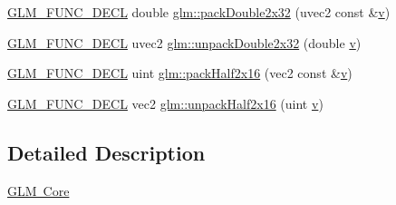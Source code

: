 \begin{DoxyCompactItemize}
\item 
\mbox{\hyperlink{setup_8hpp_ab2d052de21a70539923e9bcbf6e83a51}{G\+L\+M\+\_\+\+F\+U\+N\+C\+\_\+\+D\+E\+CL}} double \mbox{\hyperlink{group__core__func__packing_gaf728fdfb98ce34da6f968d9f6bf154d7}{glm\+::pack\+Double2x32}} (uvec2 const \&\mbox{\hyperlink{glad_8h_a14cfbe2fc2234f5504618905b69d1e06}{v}})
\item 
\mbox{\hyperlink{setup_8hpp_ab2d052de21a70539923e9bcbf6e83a51}{G\+L\+M\+\_\+\+F\+U\+N\+C\+\_\+\+D\+E\+CL}} uvec2 \mbox{\hyperlink{group__core__func__packing_gaea67aa4d065175e7746b2a8a2d00cedb}{glm\+::unpack\+Double2x32}} (double \mbox{\hyperlink{glad_8h_a14cfbe2fc2234f5504618905b69d1e06}{v}})
\item 
\mbox{\hyperlink{setup_8hpp_ab2d052de21a70539923e9bcbf6e83a51}{G\+L\+M\+\_\+\+F\+U\+N\+C\+\_\+\+D\+E\+CL}} uint \mbox{\hyperlink{group__core__func__packing_ga082f6dd65f73a547ed3067ef00be036f}{glm\+::pack\+Half2x16}} (vec2 const \&\mbox{\hyperlink{glad_8h_a14cfbe2fc2234f5504618905b69d1e06}{v}})
\item 
\mbox{\hyperlink{setup_8hpp_ab2d052de21a70539923e9bcbf6e83a51}{G\+L\+M\+\_\+\+F\+U\+N\+C\+\_\+\+D\+E\+CL}} vec2 \mbox{\hyperlink{group__core__func__packing_ga90be544929ed83fa7039208bbab8c0ba}{glm\+::unpack\+Half2x16}} (uint \mbox{\hyperlink{glad_8h_a14cfbe2fc2234f5504618905b69d1e06}{v}})
\end{DoxyCompactItemize}


\subsection{Detailed Description}
\mbox{\hyperlink{group__core}{G\+LM Core}} 